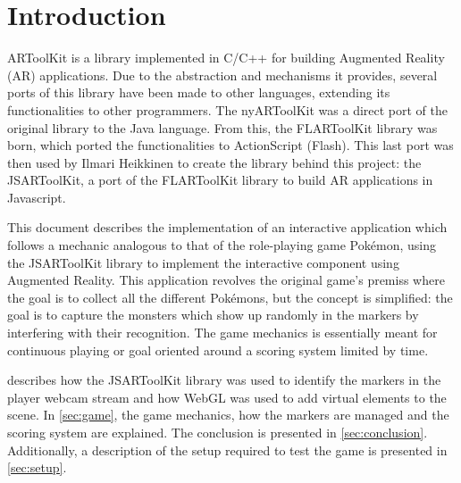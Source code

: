 \section{Introduction}
\label{sec:intro}

ARToolKit is a library implemented in C/C++ for building Augmented Reality (AR) applications. Due to the abstraction and mechanisms it provides, several ports of this library have been made to other languages, extending its functionalities to other programmers. The nyARToolKit was a direct port of the original library to the Java language. From this, the FLARToolKit library was born, which ported the functionalities to ActionScript (Flash). This last port was then used by Ilmari Heikkinen to create the library behind this project: the JSARToolKit, a port of the FLARToolKit library to build AR applications in Javascript.

This document describes the implementation of an interactive application which follows a mechanic analogous to that of the role-playing game Pokémon\textregistered, using the JSARToolKit library to implement the interactive component using Augmented Reality. This application revolves the original game's premiss where the goal is to collect all the different Pokémons, but the concept is simplified: the goal is to capture the monsters which show up randomly in the markers by interfering with their recognition. The game mechanics is essentially meant for continuous playing or goal oriented around a scoring system limited by time.

 describes how the JSARToolKit library was used to identify the markers in the player webcam stream and how WebGL was used to add virtual elements to the scene. In \cref{sec:game}, the game mechanics, how the markers are managed and the scoring system are explained. The conclusion is presented in \cref{sec:conclusion}. Additionally, a description of the setup required to test the game is presented in \cref{sec:setup}.